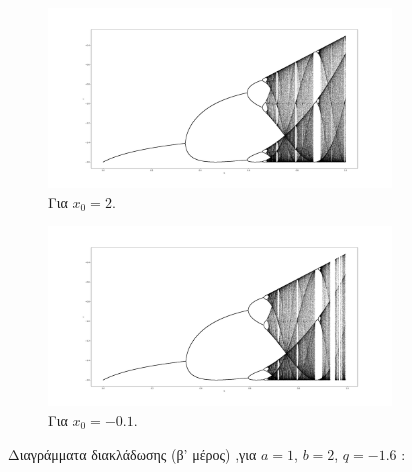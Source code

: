 \begin{figure}[h!]
	\centering
	\begin{subfigure}[b]{0.7\textwidth}
		\centering
		\includegraphics[width=\textwidth]{LateX images/graphs q16/g5}
		\caption{Για \(x_0=2\).}
		\label{f:g31}
	\end{subfigure}
	\hfill
	\begin{subfigure}[b]{0.7\textwidth}
		\centering
		\includegraphics[width=\textwidth]{LateX images/graphs q16/g6}
		\caption{Για \(x_0=-0.1\).}
		\label{f:g32}
	\end{subfigure}
	\hfill
	\caption{ Διαγράμματα διακλάδωσης (β' μέρος) ,για $a = 1$, $b = 2$, $q=-1.6$ :}
	\label{f:g234}
\end{figure}
	
